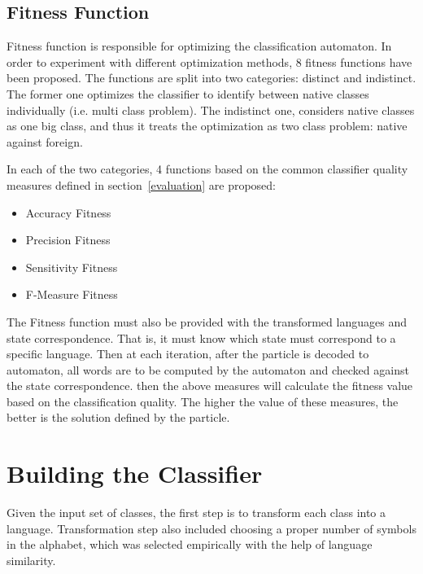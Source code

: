 \documentclass{mini}
\begin{document}
\subsection{Fitness Function}

Fitness function is responsible for optimizing the classification automaton. In order to experiment with different optimization methods, 8 fitness functions have been proposed. The functions are split into two categories: distinct and indistinct. The former one optimizes the classifier to identify between native classes individually (i.e. multi class problem). The indistinct one, considers native classes as one big class, and thus it treats the optimization as two class problem: native against foreign.

In each of the two categories, 4 functions based on the common classifier quality measures defined in section~\ref{evaluation} are proposed:
\begin{itemize}
    \item Accuracy Fitness
    \item Precision Fitness
    \item Sensitivity Fitness
    \item F-Measure Fitness
\end{itemize}

The Fitness function must also be provided with the transformed languages and state correspondence. That is, it must know which state must correspond to a specific language. Then at each iteration, after the particle is decoded to automaton, all words are to be computed by the automaton and checked against the state correspondence. then the above measures will calculate the fitness value based on the classification quality. The higher the value of these measures, the better is the solution defined by the particle.

\section{Building the Classifier}\label{sec:classification_transf_step}
Given the input set of classes, the first step is to transform each class into a language. Transformation step also included choosing a proper number of symbols in the alphabet, which was selected empirically with the help of language similarity.
\end{document}
